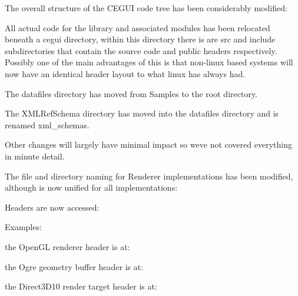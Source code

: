 \begin{DoxyItemize}
\item The overall structure of the C\+E\+G\+UI code tree has been considerably modified\+:
\begin{DoxyItemize}
\item All actual code for the library and associated modules has been relocated beneath a \textquotesingle{}cegui\textquotesingle{} directory, within this directory there is are src and include subdirectories that contain the source code and public headers respectively. Possibly one of the main advantages of this is that non-\/linux based systems will now have an identical header layout to what linux has always had.
\item The datafiles directory has moved from Samples to the root directory.
\item The X\+M\+L\+Ref\+Schema directory has moved into the datafiles directory and is renamed xml\+\_\+schemas.
\item Other changes will largely have minimal impact so we\textquotesingle{}ve not covered everything in minute detail.
\end{DoxyItemize}
\item The file and directory naming for Renderer implementations has been modified, although is now unified for all implementations\+:
\begin{DoxyItemize}
\item Headers are now accessed\+: 
\begin{DoxyCode}{0}
\end{DoxyCode}

\item Examples\+:
\begin{DoxyItemize}
\item the Open\+GL renderer header is at\+: 
\begin{DoxyCode}{0}
\end{DoxyCode}

\item the Ogre geometry buffer header is at\+: 
\begin{DoxyCode}{0}
\end{DoxyCode}

\item the Direct3\+D10 render target header is at\+: 
\begin{DoxyCode}{0}
\end{DoxyCode}

\end{DoxyItemize}
\end{DoxyItemize}
\end{DoxyItemize}

